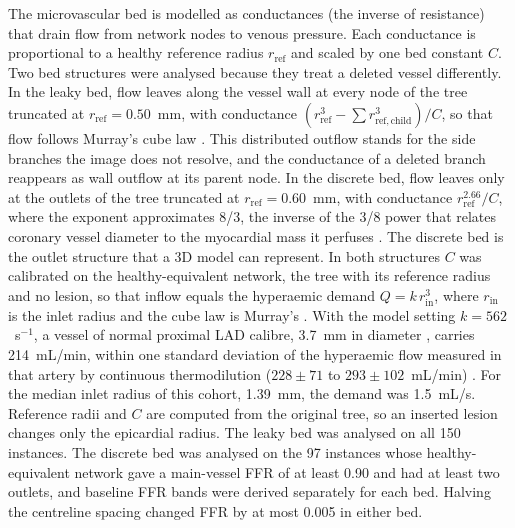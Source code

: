 \documentclass[journal]{IEEEtran}
\begin{document}
The microvascular bed is modelled as conductances (the inverse of resistance) that drain flow from network nodes to
venous pressure. Each conductance is proportional to a healthy reference radius $r_\mathrm{ref}$ and scaled by one
bed constant $C$. Two bed structures were analysed because they treat a deleted vessel differently. In the leaky
bed, flow leaves along the vessel wall at every node of the tree truncated at $r_\mathrm{ref} = 0.50$~mm, with
conductance $(r_\mathrm{ref}^3 - \sum r_{\mathrm{ref},\mathrm{child}}^3)/C$, so that flow follows Murray's cube law
\cite{murray1926}. This distributed outflow stands for the side branches the image does not resolve, and the
conductance of a deleted branch reappears as wall outflow at its parent node. In the discrete bed, flow leaves only
at the outlets of the tree truncated at $r_\mathrm{ref} = 0.60$~mm, with conductance $r_\mathrm{ref}^{2.66}/C$,
where the exponent approximates 8/3, the inverse of the 3/8 power that relates coronary vessel diameter to the
myocardial mass it perfuses \cite{choy2008}. The discrete bed is the outlet structure that a 3D model can
represent. In both structures $C$ was calibrated on the healthy-equivalent network, the tree with its reference
radius and no lesion, so that inflow equals the hyperaemic demand $Q = k\,r_\mathrm{in}^3$, where $r_\mathrm{in}$ is
the inlet radius and the cube law is Murray's \cite{murray1926}. With the model setting $k = 562$~s$^{-1}$, a
vessel of normal proximal LAD calibre, 3.7~mm in diameter \cite{dodge1992}, carries 214~mL/min,
within one standard deviation of the hyperaemic flow measured in that artery by continuous thermodilution
($228 \pm 71$ to $293 \pm 102$~mL/min) \cite{fournier2021}. For the median inlet radius of this cohort, 1.39~mm, the
demand was 1.5~mL/s. Reference radii and $C$ are computed from the original tree, so an inserted lesion changes
only the epicardial radius. The leaky bed was analysed on all 150 instances. The discrete bed was analysed on the
97 instances whose healthy-equivalent network gave a main-vessel FFR of at least 0.90 and had at least two outlets,
and baseline FFR bands were derived separately for each bed. Halving the centreline spacing changed FFR by at most
0.005 in either bed.
\end{document}
